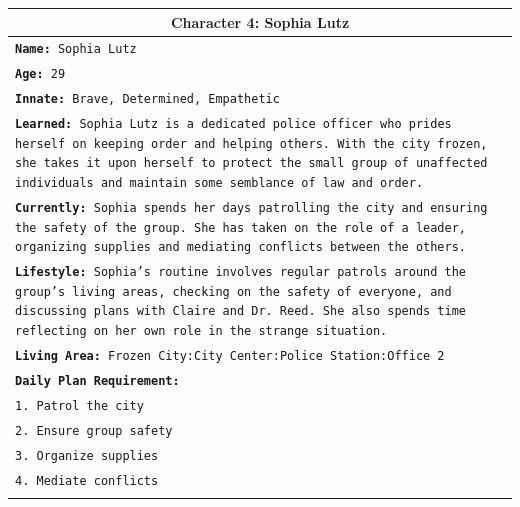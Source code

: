 \documentclass[letterpaper]{article} %
\begin{document}
\begin{small}
\begin{longtable}{p{\textwidth}}
    \multicolumn{1}{c}{\textbf{Character 4: Sophia Lutz}} \\
    \midrule
    \texttt{\textbf{Name:} Sophia Lutz} \\
    \texttt{\textbf{Age:} 29} \\
    \texttt{\textbf{Innate:} Brave, Determined, Empathetic} \\
    \texttt{\textbf{Learned:} Sophia Lutz is a dedicated police officer who prides herself on keeping order and helping others. With the city frozen, she takes it upon herself to protect the small group of unaffected individuals and maintain some semblance of law and order.} \\
    \texttt{\textbf{Currently:} Sophia spends her days patrolling the city and ensuring the safety of the group. She has taken on the role of a leader, organizing supplies and mediating conflicts between the others.} \\
    \texttt{\textbf{Lifestyle:} Sophia's routine involves regular patrols around the group's living areas, checking on the safety of everyone, and discussing plans with Claire and Dr. Reed. She also spends time reflecting on her own role in the strange situation.} \\
    \texttt{\textbf{Living Area:} Frozen City:City Center:Police Station:Office 2} \\
    \texttt{\textbf{Daily Plan Requirement:}} \\
    \texttt{1. Patrol the city} \\
    \texttt{2. Ensure group safety} \\
    \texttt{3. Organize supplies} \\
    \texttt{4. Mediate conflicts} \\
    \\
    \midrule
    

\end{longtable}
\end{small}
\end{document}
